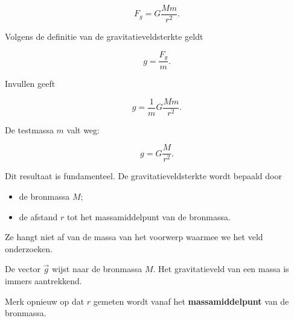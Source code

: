\documentclass{ximera}
\begin{document}
\[
F_g
=
G\frac{Mm}{r^2}.
\]

Volgens de definitie van de gravitatieveldsterkte geldt

\[
g
=
\frac{F_g}{m}.
\]

Invullen geeft

\[
g
=
\frac{1}{m}
G\frac{Mm}{r^2}.
\]

De testmassa $m$ valt weg:

\[
\boxed{
g
=
G\frac{M}{r^2}.
}
\]

Dit resultaat is fundamenteel. De gravitatieveldsterkte wordt bepaald
door

\begin{itemize}
  \item de bronmassa $M$;
  \item de afstand $r$ tot het massamiddelpunt van de bronmassa.
\end{itemize}

Ze hangt niet af van de massa van het voorwerp waarmee we het veld
onderzoeken.



\begin{center}
\end{center}

De vector $\vec g$ wijst naar de bronmassa $M$.
Het gravitatieveld van een massa is immers aantrekkend.

Merk opnieuw op dat $r$ gemeten wordt vanaf het
\textbf{massamiddelpunt} van de bronmassa.
\end{document}
